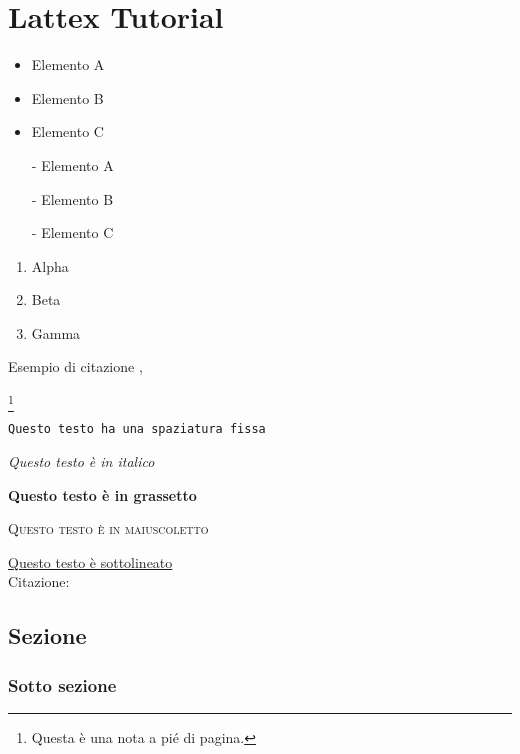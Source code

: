 \documentclass[twoside]{supsistudent}
\begin{document}
\chapter{Lattex Tutorial}
\lipsum[13]

\begin{itemize}
  \item Elemento A
  \item Elemento B
  \item Elemento C
\end{itemize}

\begin{itemize}
  \item[-] Elemento A
  \item[-] Elemento B
  \item[-] Elemento C
\end{itemize}

\begin{enumerate}
 \item Alpha
  \item Beta
  \item Gamma
\end{enumerate}

Esempio di citazione \cite{4538384},

\footnote{Questa è una nota a pi\'e di pagina.}

\texttt{Questo testo ha una spaziatura fissa}

\textit{Questo testo \`e in italico}

\textbf{Questo testo \`e in grassetto}

\textsc{Questo testo \`e in maiuscoletto}

\underline{Questo testo \`e sottolineato} \\

Citazione:
\begin{quote}
\lipsum[23]
\end{quote}

\section{Sezione}

\lipsum[23]

\subsection{Sotto sezione}
\end{document}
